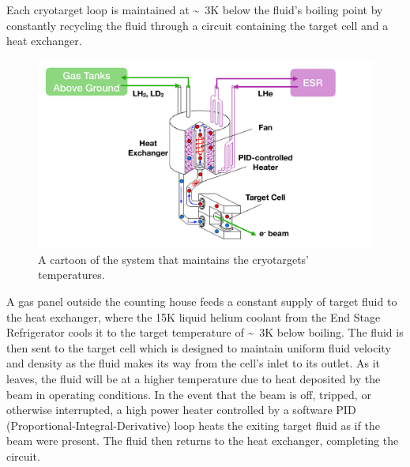 Each cryotarget loop is maintained at \si{\sim3}{K} below the fluid's boiling
point by constantly recycling the fluid through a circuit containing the target
cell and a heat exchanger.

\begin{figure}[!h]
    \centering
    \includegraphics[width=1.0\textwidth]{chap3/target_cell_temperature_control.pdf}
    \caption{A cartoon of the system that maintains the cryotargets'
             temperatures.
            }
    \label{fig:cryotarget_temperature_regulation}
\end{figure}

A gas panel outside the counting house feeds a constant supply of target fluid
to the heat exchanger, where the \si{15}{K} liquid helium coolant from the End
Stage Refrigerator cools it to the target temperature of \si{\sim3}{K} below
boiling.
The fluid is then sent to the target cell which is  designed to maintain
uniform fluid velocity and density as the fluid makes its way from the cell's
inlet to its outlet.
As it leaves, the fluid will be at a higher temperature due to heat deposited
by the beam in operating conditions.
In the event that the beam is off, tripped, or otherwise interrupted, a high
power heater controlled by a software PID (Proportional-Integral-Derivative)
loop heats the exiting target fluid as if the beam were present.
The fluid then returns to the heat exchanger, completing the circuit.
